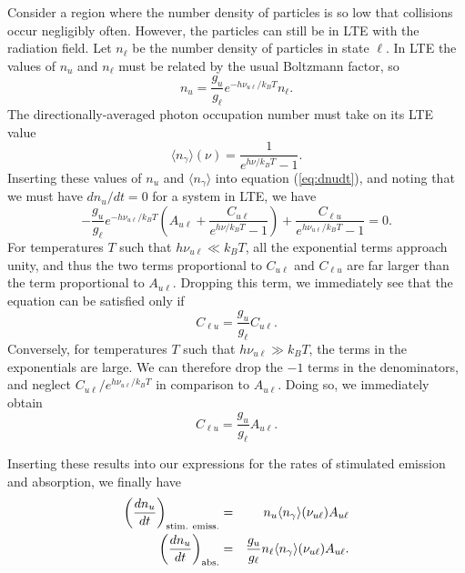 Consider a region where the number density of particles is so low that collisions occur negligibly often. However, the particles can still be in LTE with the radiation field. Let $n_\ell$ be the number density of particles in state $\ell$. In LTE the values of $n_u$ and $n_\ell$ must be related by the usual Boltzmann factor, so
\begin{equation}
n_u = \frac{g_u}{g_\ell} e^{-h\nu_{u\ell}/k_B T} n_\ell.
\end{equation}
The directionally-averaged photon occupation number must take on its LTE value
\begin{equation}
\langle n_\gamma\rangle(\nu) = \frac{1}{e^{h\nu/k_B T} - 1}.
\end{equation}
Inserting these values of $n_u$ and $\langle n_\gamma\rangle$ into equation (\ref{eq:dnudt}), and noting that we must have $dn_u/dt = 0$ for a system in LTE, we have
\begin{equation}
-\frac{g_u}{g_\ell} e^{-h\nu_{u\ell}/k_B T} \left(A_{u\ell} + \frac{C_{u\ell}}{e^{h\nu/k_B T} - 1}\right) + \frac{C_{\ell u} }{e^{h\nu_{u\ell}/k_B T} - 1} = 0.
\end{equation}
For temperatures $T$ such that $h\nu_{u\ell} \ll k_B T$, all the exponential terms approach unity, and thus the two terms proportional to $C_{u\ell}$ and $C_{\ell u}$ are far larger than the term proportional to $A_{u\ell}$. Dropping this term, we immediately see that the equation can be satisfied only if
\begin{equation}
C_{\ell u} = \frac{g_u}{g_\ell} C_{u\ell}.
\end{equation} Conversely, for temperatures $T$ such that $h\nu_{u\ell} \gg k_B T$, the terms in the exponentials are large. We can therefore drop the $-1$ terms in the denominators, and neglect $C_{u\ell}/e^{h\nu_{u\ell}/k_B T}$ in comparison to $A_{u\ell}$. Doing so, we immediately obtain
\begin{equation}
C_{\ell u} = \frac{g_u}{g_\ell} A_{u\ell}.
\end{equation}

Inserting these results into our expressions for the rates of stimulated emission and absorption, we finally have
\begin{eqnarray}
\left(\frac{dn_u}{dt}\right)_{\rm stim.~emiss.} & = & n_u \langle n_\gamma\rangle(\nu_{u\ell}) A_{u\ell} \\
\left(\frac{dn_u}{dt}\right)_{\rm abs.} & = & \frac{g_u}{g_\ell} n_\ell \langle n_\gamma\rangle(\nu_{u\ell}) A_{u\ell}.
\end{eqnarray}

